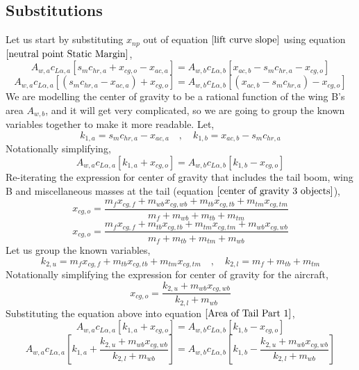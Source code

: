 \subsection{Substitutions}
\begin{comment}
\end{comment}
Let us start by substituting $x_{np}$ out of equation $\ref{lift curve slope}$ using equation $\ref{neutral point Static Margin}$,
$$A_{w,a} c_{L\alpha,a} \left[s_{m}c_{hr,a} + x_{cg,o} - x_{ac,a}\right] = A_{w,b} c_{L\alpha,b}\left[x_{ac,b} -s_{m}c_{hr,a} - x_{cg,o}\right] $$
$$A_{w,a} c_{L\alpha,a} \left[(s_{m}c_{hr,a} - x_{ac,a}) + x_{cg,o}\right] = A_{w,b} c_{L\alpha,b}\left[(x_{ac,b} -s_{m}c_{hr,a}) - x_{cg,o}\right] $$
We are modelling the center of gravity to be a rational function of the wing B's area $A_{w,b}$, and it will get very complicated, so we are going to group the known variables together to make it more readable. Let,
\begin{equation}k_{1,a} = s_{m}c_{hr,a} - x_{ac,a} \quad,\quad k_{1,b} = x_{ac,b} -s_{m}c_{hr,a} \label{k1 definitions}\end{equation}
Notationally simplifying,
\begin{equation}A_{w,a} c_{L\alpha,a} \left[k_{1,a} + x_{cg,o}\right] = A_{w,b} c_{L\alpha,b}\left[k_{1,b} - x_{cg,o}\right] \label{Area of Tail Part 1}\end{equation}
Re-iterating the expression for center of gravity that includes the tail boom, wing B and miscellaneous masses at the tail (equation $\ref{center of gravity 3 objects}$),
$$x_{cg,o} = \frac{m_{f}x_{cg,f} + m_{wb}x_{cg,wb} + m_{tb}x_{cg,tb} + m_{tm}x_{cg,tm}}{m_{f} + m_{wb} + m_{tb} + m_{tm}} $$
$$x_{cg,o} = \frac{m_{f}x_{cg,f} + m_{tb}x_{cg,tb} + m_{tm}x_{cg,tm} + m_{wb}x_{cg,wb}}{m_{f} + m_{tb} + m_{tm} + m_{wb}}$$
Let us group the known variables,
\begin{equation}k_{2,u} = m_{f}x_{cg,f} + m_{tb}x_{cg,tb} + m_{tm}x_{cg,tm} \quad,\quad k_{2,l} = m_{f} + m_{tb} + m_{tm} \label{k2 definitions}\end{equation}
Notationally simplifying the expression for center of gravity for the aircraft,
$$x_{cg,o} = \frac{ k_{2,u} + m_{wb}x_{cg,wb}}{k_{2,l} + m_{wb}}$$
Substituting the equation above into equation $\ref{Area of Tail Part 1}$,
$$A_{w,a} c_{L\alpha,a} \left[k_{1,a} + x_{cg,o}\right] = A_{w,b} c_{L\alpha,b}\left[k_{1,b} - x_{cg,o}\right] $$
$$A_{w,a} c_{L\alpha,a} \left[k_{1,a} + \frac{ k_{2,u} + m_{wb}x_{cg,wb}}{k_{2,l} + m_{wb}}\right] = A_{w,b} c_{L\alpha,b}\left[k_{1,b} - \frac{ k_{2,u} + m_{wb}x_{cg,wb}}{k_{2,l} + m_{wb}}\right] $$

